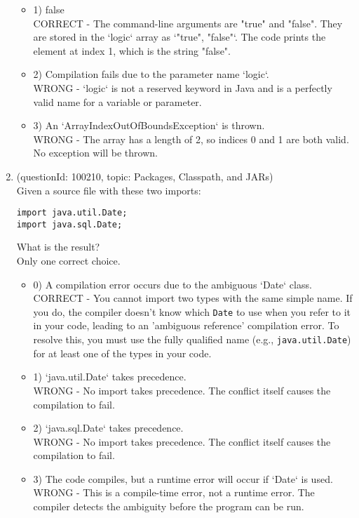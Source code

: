 \documentclass[12pt]{article}
\begin{document}
\begin{enumerate}[label=(\arabic*)]
\begin{itemize}
\item 1) false
 \\ 
CORRECT - The command-line arguments are "true" and "false". They are stored in the `logic` array as `{"true", "false"}`. The code prints the element at index 1, which is the string "false".

\item 2) Compilation fails due to the parameter name `logic`.
 \\ 
WRONG - `logic` is not a reserved keyword in Java and is a perfectly valid name for a variable or parameter.

\item 3) An `ArrayIndexOutOfBoundsException` is thrown.
 \\ 
WRONG - The array has a length of 2, so indices 0 and 1 are both valid. No exception will be thrown.

\end{itemize}
\item (questionId: 100210, topic: Packages, Classpath, and JARs) \\ 
Given a source file with these two imports:
\begin{verbatim}
import java.util.Date;
import java.sql.Date;
\end{verbatim}
What is the result?
\\ \noindent Only one correct choice. 
\begin{itemize}
\item 0) A compilation error occurs due to the ambiguous `Date` class.
 \\ 
CORRECT - You cannot import two types with the same simple name. If you do, the compiler doesn't know which \verb|Date| to use when you refer to it in your code, leading to an 'ambiguous reference' compilation error. To resolve this, you must use the fully qualified name (e.g., \verb|java.util.Date|) for at least one of the types in your code.

\item 1) `java.util.Date` takes precedence.
 \\ 
WRONG - No import takes precedence. The conflict itself causes the compilation to fail.

\item 2) `java.sql.Date` takes precedence.
 \\ 
WRONG - No import takes precedence. The conflict itself causes the compilation to fail.

\item 3) The code compiles, but a runtime error will occur if `Date` is used.
 \\ 
WRONG - This is a compile-time error, not a runtime error. The compiler detects the ambiguity before the program can be run.


\end{itemize}
\end{enumerate}
\end{document}
